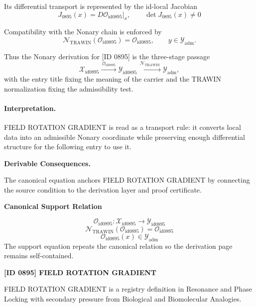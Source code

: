 Its differential transport is represented by the id-local Jacobian\[
J_{0895}(x)=D\mathcal{O}_{\mathrm{id0895}}\big|_x,\qquad \det J_{0895}(x)\neq 0
\]

Compatibility with the Nonary chain is enforced by\[
\mathcal{N}_{\mathrm{TRAWIN}}(\mathcal{O}_{\mathrm{id0895}})=\mathcal{O}_{\mathrm{id0895}},\qquad y\in\mathcal{Y}_{\mathrm{adm}}.
\]

Thus the Nonary derivation for [ID 0895] is the three-stage passage
\[
\mathcal{X}_{\mathrm{id0895}}\xrightarrow{\,\mathcal{O}_{\mathrm{id0895}}\,} \mathcal{Y}_{\mathrm{id0895}}\xrightarrow{\,\mathcal{N}_{\mathrm{TRAWIN}}\,} \mathcal{Y}_{\mathrm{adm}},
\]
with the entry title fixing the meaning of the carrier and the TRAWIN normalization fixing the admissibility test.

\paragraph{Interpretation.} FIELD ROTATION GRADIENT is read as a transport rule: it converts local data into an admissible Nonary coordinate while preserving enough differential structure for the following entry to use it.

\par\vspace{0.35em}
\noindent\textbf{Derivable Consequences.}\quad
\begingroup
\footnotesize
\raggedright
The canonical equation anchors FIELD ROTATION GRADIENT by connecting the source condition to the derivation layer and proof certificate.
\par\endgroup

\noindent\textbf{Canonical Support Relation}\par
\[
\mathcal{O}_{\mathrm{id0895}}:\mathcal{X}_{\mathrm{id0895}}\longrightarrow\mathcal{Y}_{\mathrm{id0895}}
\]
\[
\mathcal{N}_{\mathrm{TRAWIN}}(\mathcal{O}_{\mathrm{id0895}})=\mathcal{O}_{\mathrm{id0895}}
\]
\[
\mathcal{O}_{\mathrm{id0895}}(x)\in\mathcal{Y}_{\mathrm{adm}}
\]
\noindent The support equation repeats the canonical relation so the derivation page remains self-contained.\par

\clearpage
\noindent\textbf{[ID 0895] FIELD ROTATION GRADIENT}\par
\vspace{0.35em}
\begingroup\small
{}
FIELD ROTATION GRADIENT is a registry definition in Resonance and Phase Locking with secondary pressure from Biological and Biomolecular Analogies.

